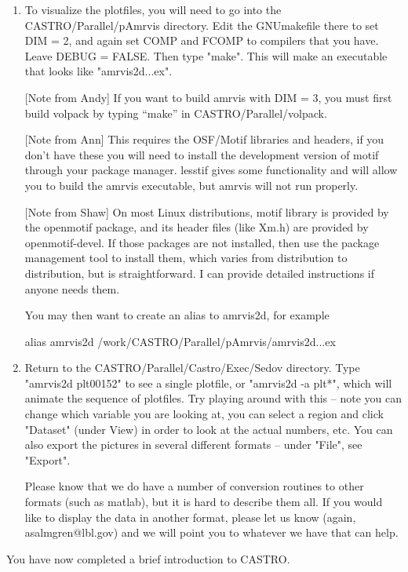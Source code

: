 \begin{enumerate}

\item To visualize the plotfiles, you will need to go into the CASTRO/Parallel/pAmrvis 
directory. Edit the GNUmakefile there to set DIM = 2, and again set COMP and FCOMP to 
compilers that you have. Leave DEBUG = FALSE. Then type "make".  This will make an 
executable that looks like "amrvis2d...ex".

[Note from Andy] If you want to build amrvis with DIM = 3, you must first build volpack by 
typing ``make'' in CASTRO/Parallel/volpack.

[Note from Ann] This requires the OSF/Motif libraries and headers, if you don't have these 
you will need to install the development version of motif through your package manager. 
lesstif gives some functionality and will allow you to build the amrvis executable, 
but amrvis will not run properly.

[Note from Shaw] On most Linux distributions, motif library is provided by the openmotif package, 
and its header files (like Xm.h) are provided by openmotif-devel. If those packages are not 
installed, then use the package management tool to install them, which varies from distribution 
to distribution, but is straightforward. I can provide detailed instructions if anyone needs them.

You may then want to create an alias to amrvis2d, for example

alias amrvis2d /work/CASTRO/Parallel/pAmrvis/amrvis2d...ex

\item Return to the CASTRO/Parallel/Castro/Exec/Sedov directory. 
Type "amrvis2d plt00152" to see a single plotfile, or "amrvis2d -a plt*", 
which will animate the sequence of plotfiles. Try playing around with this -- note you can change which 
variable you are looking at, you can select a region and click "Dataset" (under View) in order to look at 
the actual numbers, etc. You can also export the pictures in several different formats -- under "File", see "Export".

Please know that we do have a number of conversion routines to other formats (such as matlab), 
but it is hard to describe them all. If you would like to display the data in another format, 
please let us know (again, asalmgren@lbl.gov) and we will point you to whatever we have that can help.

\end{enumerate}

You have now completed a brief introduction to CASTRO. 

